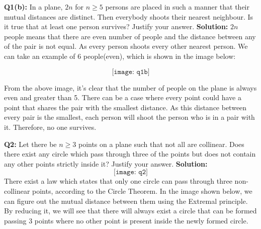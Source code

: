 \documentclass{article}
\begin{document}
\begin{flushleft}
\textbf{Q1(b): } In a plane, $2n$ for $n \geq 5$ persons are placed in such a manner that their mutual distances are distinct. Then everybody shoots their nearest neighbour. Is it true that at least one person survives? Justify your answer.
\newline
\newline
\textbf{Solution: } $2n$ people means that there are even number of people and the distance between any of the pair is not equal. As every person shoots every other nearest person. We can take an example of 6 people(even), which is shown in the image below:

\[\texttt{[image: q1b]}\]

From the above image, it's clear that the number of people on the plane is always even and greater than 5. There can be a case where every point could have a point that shares the pair with the smallest distance. As this distance between every pair is the smallest, each person will shoot the person who is in a pair with it. Therefore, no one survives.

\end{flushleft}
\begin{flushleft}
\textbf{Q2: }Let there be $n \geq 3$ points on a plane such that not all are collinear. Does there exist any circle which pass through three of the points but does not contain any other points strictly inside it? Justify your answer.
\newline
\newline
\textbf{Solution: }
\[\texttt{[image: q2]}\]
There exist a law which states that only one circle can pass through three non- collinear points, according to the Circle Theorem. In the image shown below, we can figure out the mutual distance between them using the Extremal principle. By reducing it, we will see that there will always exist a circle that can be formed passing 3 points where no other point is present inside the newly formed circle.


\end{flushleft}
\end{document}

